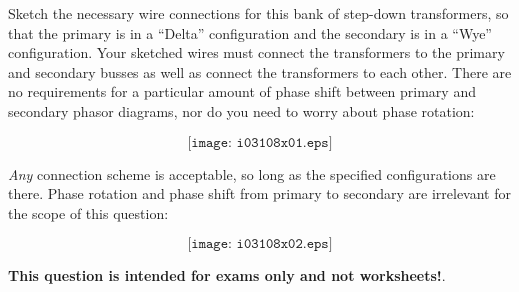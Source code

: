 

Sketch the necessary wire connections for this bank of step-down transformers, so that the primary is in a ``Delta'' configuration and the secondary is in a ``Wye'' configuration.  Your sketched wires must connect the transformers to the primary and secondary busses as well as connect the transformers to each other.  There are no requirements for a particular amount of phase shift between primary and secondary phasor diagrams, nor do you need to worry about phase rotation:

$$\texttt{[image: i03108x01.eps]}$$







{\it Any} connection scheme is acceptable, so long as the specified configurations are there.  Phase rotation and phase shift from primary to secondary are irrelevant for the scope of this question:

$$\texttt{[image: i03108x02.eps]}$$
 






{\bf This question is intended for exams only and not worksheets!}.



